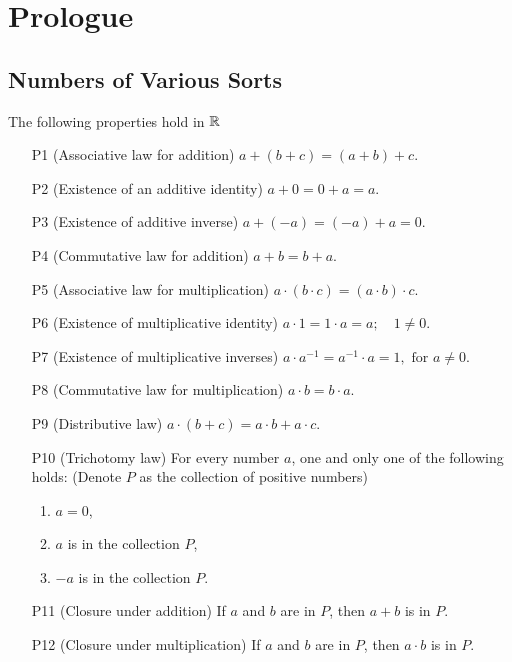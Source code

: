 \section{Prologue}
\subsection{Numbers of Various Sorts}
\begin{defi} The following properties hold in $\mathbb{R}$
    
     \begin{itemize}
         \item[P1](Associative law for addition) \hfill $a+(b+c) = (a+b)+c$.
         \item[P2](Existence of an additive identity) \hfill $a+0=0+a=a$.
         \item[P3](Existence of additive inverse) \hfill $a+(-a)=(-a)+a=0 $.
         \item[P4](Commutative law for addition) \hfill $a+b=b+a$.
         \item[P5](Associative law for multiplication) \hfill $a\cdot(b\cdot c)
         = (a\cdot b)\cdot c$.
         \item[P6](Existence of multiplicative identity) \hfill $a\cdot 1 =
         1\cdot a = a;\quad 1 \neq 0$.
         \item[P7](Existence of multiplicative inverses) \hfill $a\cdot a^{-1} =
         a^{-1}\cdot a = 1,\text{ for } a \neq 0$.
         \item[P8](Commutative law for multiplication) \hfill $a\cdot b = b\cdot a$.
         \item[P9](Distributive law) \hfill $a\cdot(b+c) = a\cdot b+ a\cdot c$.
         \item[P10](Trichotomy law) For every number $a$, one and only one of
         the following holds: (Denote $P$ as the collection of positive numbers)
            \begin{enumerate}
                \item $a=0$,
                \item $a $ is in the collection $P$,
                \item $-a $ is in the collection $P$.
            \end{enumerate}
        \item[P11](Closure under addition) If $a $ and $ b $ are in $ P $, then
        $a+b$ is in $P$.
        \item[P12](Closure under multiplication) If $a$ and $b$ are in $P$, then
        $a\cdot b$ is in $P$.
     \end{itemize}
\end{defi}
